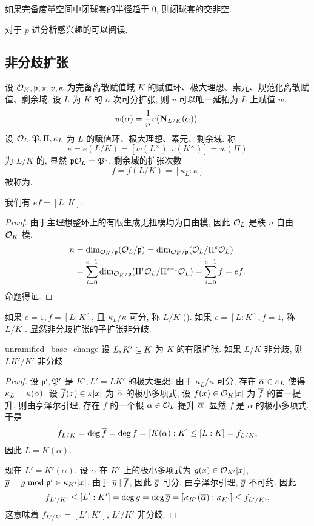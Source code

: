 \begin{exercise}
如果完备度量空间中闭球套的半径趋于 $0$, 则闭球套的交非空.
\end{exercise}

对于 $p$ 进分析感兴趣的可以阅读\cite{Colmez2004,Robert2000}.

\subsection{非分歧扩张}
\label{ramification_theory_on_local_fields}
设 ${\mathcal{O}}_K,{\mathfrak{p}},\pi,v,\kappa$ 为完备离散赋值域 $K$ 的赋值环、极大理想、素元、规范化离散赋值、剩余域. 设 $L$ 为 $K$ 的 $n$ 次可分扩张, 则 $v$ 可以唯一延拓为 $L$ 上赋值 $w$,
  \[w(\alpha)=\frac{1}{n}v\bigl({\mathbf{N}}_{L/K}(\alpha)\bigr).\]
设 ${\mathcal{O}}_L,{\mathfrak{P}},\Pi,\kappa_L$ 为 $L$ 的赋值环、极大理想、素元、剩余域. 称
  \[e=e(L/K)=[w(L^\times):v(K^\times)]=w(\Pi)\]
为 $L/K$ 的, 显然 ${\mathfrak{p}}{\mathcal{O}}_L={\mathfrak{P}}^e$. 剩余域的扩张次数
  \[f=f(L/K)=[\kappa_L:\kappa]\]
被称为. 

\begin{proposition}{}{}
我们有 $ef=[L:K]$.
\end{proposition}
\begin{proof}
由于主理想整环上的有限生成无扭模均为自由模, 因此 ${\mathcal{O}}_L$ 是秩 $n$ 自由 ${\mathcal{O}}_K$ 模,
  \[\begin{split}
   n&=\dim_{{\mathcal{O}}_K/{\mathfrak{p}}}({\mathcal{O}}_L/{\mathfrak{p}})=\dim_{{\mathcal{O}}_K/{\mathfrak{p}}}({\mathcal{O}}_L/\Pi^e {\mathcal{O}}_L)\\
    &=\sum_{i=0}^{e-1}\dim_{{\mathcal{O}}_K/{\mathfrak{p}}}(\Pi^i{\mathcal{O}}_L/\Pi^{i+1} {\mathcal{O}}_L)=\sum_{i=0}^{e-1}f=ef.
  \end{split}\]
命题得证.
\end{proof}

如果 $e=1,f=[L:K]$, 且 $\kappa_L/\kappa$ 可分, 称 $L/K$ (). 如果 $e=[L:K],f=1$, 称 $L/K$ . 显然非分歧扩张的子扩张非分歧.

\begin{proposition}{}{unramified_base_change}
设 $L,K'\subseteq \overline K$ 为 $K$ 的有限扩张. 如果 $L/K$ 非分歧, 则 $LK'/K'$ 非分歧. 
\end{proposition}
\begin{proof}
设 ${\mathfrak{p}}',{\mathfrak{P}}'$ 是 $K',L'=LK'$ 的极大理想.
由于 $\kappa_L/\kappa$ 可分, 存在 $\overline\alpha\in \kappa_L$ 使得 $\kappa_L=\kappa(\overline\alpha)$. 设 $\overline f(x)\in\kappa[x]$ 为 $\overline\alpha$ 的极小多项式, 设 $f(x)\in{\mathcal{O}}_K[x]$ 为 $\overline f$ 的首一提升, 则由亨泽尔引理, 存在 $f$ 的一个根 $\alpha\in{\mathcal{O}}_L$ 提升 $\overline\alpha$. 显然 $f$ 是 $\alpha$ 的极小多项式. 于是
  \[f_{L/K}=\deg\overline f=\deg f=[K(\alpha):K]\le [L:K]=f_{L/K},\]
因此 $L=K(\alpha)$.

现在 $L'=K'(\alpha)$. 设 $\alpha$ 在 $K'$ 上的极小多项式为 $g(x)\in{\mathcal{O}}_{K'}[x]$, $\overline g=g\bmod {\mathfrak{p}}'\in\kappa_{K'}[x]$. 由于 $\overline g\mid \overline f$, 因此 $\overline g$ 可分. 由亨泽尔引理, $\overline g$ 不可约. 因此
  \[f_{L'/K'}\le [L':K']=\deg g=\deg\overline g=[\kappa_{K'}(\overline\alpha):\kappa_{K'}]\le f_{L'/K'},\]
这意味着 $f_{L'/K'}=[L':K']$, $L'/K'$ 非分歧.
\end{proof}

